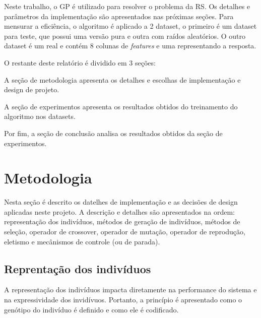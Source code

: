\documentclass[a4paper]{paper}
\begin{document}
\begin{center}
\end{center}

Neste trabalho, o GP é utilizado para resolver o problema da RS. Os detalhes e
parâmetros da implementação são apresentados nas próximas seções. Para mensurar
a eficiência, o algoritmo é aplicado a 2 dataset, o primeiro é um dataset para
teste, que possui uma versão pura e outra com raídos aleatórios. O outro dataset
é um real e contém 8 colunas de \textit{features} e uma representando a
resposta.

O restante deste relatório é dividido em 3 seções: 
\begin{ilist}
\item A seção de metodologia apresenta os detalhes e escolhas de implementação
  e design de projeto.
\item A seção de experimentos apresenta os resultados obtidos do treinamento
  do algoritmo nos datasets.
\item Por fim, a seção de conclusão analisa os resultados obtidos da seção de
  experimentos.
\end{ilist}

\section{Metodologia} \label{sec:metodologia}
Nesta seção é descrito os datelhes de implementação e as decisões de design
aplicadas neste projeto. A descrição e detalhes são apresentados na ordem:
representação dos indivíduos, métodos de geração de indivíduos, métodos de
seleção, operador de crossover, operador de mutação, operador de reprodução,
eletismo e mecânismos de controle (ou de parada).

\subsection{Reprentação dos indivíduos} \label{subsec:representacao}
A representação dos indivíduos impacta diretamente na performance do sistema e
na expressividade dos invidívuos. Portanto, a princípio é apresentado como o
genótipo do indivíduo é definido e como ele é codificado.
\end{document}
